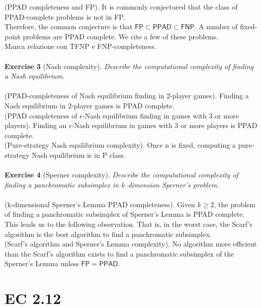 (\textsf{PPAD} completeness and \textsf{FP}). It is commonly conjectured that the class of \textsf{PPAD}-complete problems is not in \textsf{FP}.\\
Therefore, the common conjecture is that $\mathsf{FP} \subset \mathsf{PPAD} \subset \mathsf{FNP}$. A number of fixed-point problems are \textsf{PPAD} complete. We cite a few of these problems.\\
Manca relazione con TFNP e FNP-completeness.\\\\
\textbf{Exercise 3} (Nash complexity). \textit{Describe the computational complexity of finding a Nash equilibrium.}\\\\
(\textsf{PPAD}-completeness of Nash equilibrium finding in 2-player games). Finding a Nash equilibrium in 2-player games is \textsf{PPAD} complete.\\
(\textsf{PPAD} completeness of $\epsilon$-Nash equilibrium finding in games with 3 or more players). Finding an $\epsilon$-Nash equilibrium in games with 3 or more players is \textsf{PPAD} complete.\\
(Pure-strategy Nash equilibrium complexity). Once n is fixed, computing a pure-strategy Nash equilibrium is in \textsf{P} class.\\\\
\textbf{Exercise 4} (Sperner complexity). \textit{Describe the computational complexity of finding a panchromatic subsimplex in k–dimension Sperner’s problem.}\\\\
(k-dimensional Sperner’s Lemma \textsf{PPAD} completeness). Given $k \geqslant 2$, the problem of finding a panchromatic subsimplex of Sperner’s Lemma is \textsf{PPAD} complete.\\
This leads us to the following observation. That is, in the worst case, the Scarf’s algorithm is the best algorithm to find a panchromatic subsimplex.\\
(Scarf’s algorithm and Sperner’s Lemma complexity). No algorithm more efficient than the Scarf’s algorithm exists to find a panchromatic subsimplex of the Sperner’s Lemma unless $\mathsf{FP} = \mathsf{PPAD}$.

\section{EC 2.12}

